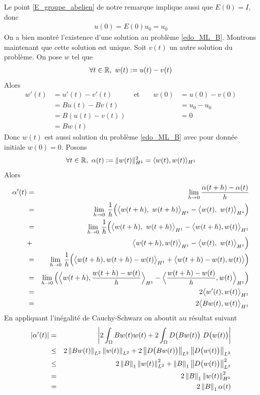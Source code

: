 Le point \ref{E_groupe_abelien} de notre remarque implique aussi que $E(0) = I$, donc
\begin{eqnarray*}
    u(0) = E(0)u_0 = u_0
\end{eqnarray*}
On a bien montré l'existence d'une solution au problème \eqref{edo_ML_B}. Montrons maintenant que cette solution est unique. Soit $v(t)$ un autre solution du problème. On pose $w$ tel que
\begin{eqnarray*}
    \forall t \in \mathbb{R} ,\ w(t) := u(t) - v(t)
\end{eqnarray*}
Alors
\begin{align*}
    w'(t) &= u'(t) - v'(t) & \text{ et } &&w(0) &= u(0) -v(0)\\
          &=Bu(t) - Bv(t)  &           &&       &= u_0 - u_0\\
          &=B(u(t) - v(t)) &           &&       &= 0 \\
          &=Bw(t)          &           &&    
\end{align*}
Donc $w(t)$ est aussi solution du problème \eqref{edo_ML_B} avec pour donnée initiale $w(0)=0$. Posons 
\begin{equation*}
    \forall t \in \mathbb{R}, \ \alpha(t) := \|w(t)\|_{H^1}^2=\langle w(t), w(t) \rangle_{H^1}
\end{equation*}
Alors
\begin{eqnarray*}
    \alpha'(t) &=& \lim_{h \to 0} \frac{\alpha(t+h) - \alpha(t)}{h} \\
    &=& \underset{h \rightarrow0}{\lim} \ \dfrac{1}{h} \Big( \big\langle w(t+h),\ w(t+h)\big\rangle_{H^1} - \big\langle w(t),\ w(t)\big\rangle_{H^1} \Big) \\
    &=& \underset{h \rightarrow0}{\lim} \ \dfrac{1}{h} \Big( \big\langle w(t+h),\ w(t+h)\big\rangle_{H^1} - \big\langle w(t+h),w(t)\big\rangle_{H^1} \\
    &+& \big\langle w(t+h),w(t)\big\rangle_{H^1}-\big\langle w(t),\ w(t)\big\rangle_{H^1} \Big) \\
    &=& \underset{h \rightarrow0}{\lim} \ \dfrac{1}{h} \Big(\big\langle w(t+h), w(t+h) - w(t)\big\rangle_{H^1} + \big\langle w(t+h) - w(t), w(t)\big\rangle \Big) \\
    &=& \lim_{h \to 0} \Big(\Big\langle w(t+h), \frac{w(t+h) - w(t)}{h}\Big\rangle_{H^1} - \Big\langle \frac{w(t+h) - w(t)}{h}, w(t)\Big\rangle_{H^1} \Big) \\
    &=& 2 \big\langle w'(t), w(t) \big\rangle_{H^1} \\
    &=& 2 \big\langle Bw(t), w(t) \big\rangle_{H^1}
\end{eqnarray*}
En appliquant l'inégalité de Cauchy-Schwarz on aboutit au résultat suivant
\begin{eqnarray*}
    \displaystyle\left\lvert \alpha'(t) \right\rvert &=& \displaystyle\left\lvert 2 \int_{\Omega}Bw(t)w(t) + 2\int_{\Omega}D\big(Bw(t)\big) \ D\big(w(t)\big) \right\rvert \\
    &\leq& 2 \left\lVert Bw(t) \right\rVert_{L^2} \left\lVert w(t) \right\rVert_{L^2} + 2\left\lVert D\big(Bw(t)\big) \right\rVert_{L^2} \left\lVert D\big(w(t)\big) \right\rVert_{L^2} \\
    &\leq& 2 \left\lVert B \right\rVert_1 \left\lVert w(t) \right\rVert^2_{L^2} + \left\lVert B \right\rVert_1 \left\lVert D\big(w(t)\big) \right\rVert^2_{L^2} \\
    &=& 2 \left\lVert B \right\rVert_1 \left\lVert w(t) \right\rVert^2_{H^1}\\
    &=& 2\left\lVert B \right\rVert_1 \alpha(t)    
\end{eqnarray*}
